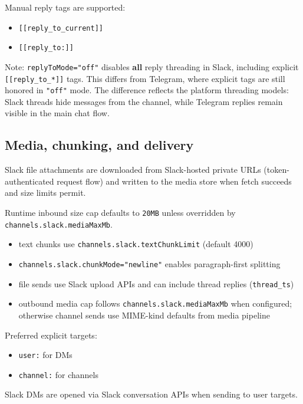 Manual reply tags are supported:

\begin{itemize}
  \item \texttt{[[reply\_to\_current]]}
  \item \texttt{[[reply\_to:]]}
\end{itemize}


Note: \texttt{replyToMode="off"} disables \textbf{all} reply threading in Slack, including explicit \texttt{[[reply\_to\_*]]} tags. This differs from Telegram, where explicit tags are still honored in \texttt{"off"} mode. The difference reflects the platform threading models: Slack threads hide messages from the channel, while Telegram replies remain visible in the main chat flow.

\subsection{Media, chunking, and delivery}


Slack file attachments are downloaded from Slack-hosted private URLs (token-authenticated request flow) and written to the media store when fetch succeeds and size limits permit.

Runtime inbound size cap defaults to \texttt{20MB} unless overridden by \texttt{channels.slack.mediaMaxMb}.


\begin{itemize}
  \item text chunks use \texttt{channels.slack.textChunkLimit} (default 4000)
  \item \texttt{channels.slack.chunkMode="newline"} enables paragraph-first splitting
  \item file sends use Slack upload APIs and can include thread replies (\texttt{thread\_ts})
  \item outbound media cap follows \texttt{channels.slack.mediaMaxMb} when configured; otherwise channel sends use MIME-kind defaults from media pipeline
\end{itemize}


Preferred explicit targets:

\begin{itemize}
  \item \texttt{user:} for DMs
  \item \texttt{channel:} for channels
\end{itemize}


Slack DMs are opened via Slack conversation APIs when sending to user targets.


